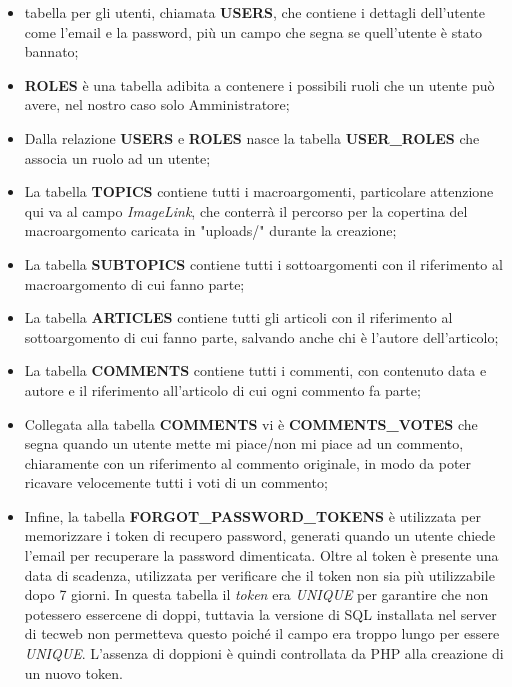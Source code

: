 \documentclass[12pt]{article}
\begin{document}
	\begin{itemize}
	\item tabella per gli utenti, chiamata \textbf{USERS}, che contiene i dettagli dell'utente come l'email e la password, più un campo che segna se quell'utente è stato bannato;
	\item \textbf{ROLES} è una tabella adibita a contenere i possibili ruoli che un utente può avere, nel nostro caso solo Amministratore;
	\item Dalla relazione \textbf{USERS} e \textbf{ROLES} nasce la tabella \textbf{USER\_ROLES} che associa un ruolo ad un utente;
	\item La tabella \textbf{TOPICS} contiene tutti i macroargomenti, particolare attenzione qui va al campo \textit{ImageLink}, che conterrà il percorso per la copertina del macroargomento caricata in "uploads/" durante la creazione;
	\item La tabella \textbf{SUBTOPICS} contiene tutti i sottoargomenti con il riferimento al macroargomento di cui fanno parte;
	\item La tabella \textbf{ARTICLES} contiene tutti gli articoli con il riferimento al sottoargomento di cui fanno parte, salvando anche chi è l'autore dell'articolo;
	\item La tabella \textbf{COMMENTS} contiene tutti i commenti, con contenuto data e autore e il riferimento all'articolo di cui ogni commento fa parte;
	\item Collegata alla tabella \textbf{COMMENTS} vi è \textbf{COMMENTS\_VOTES} che segna quando un utente mette mi piace/non mi piace ad un commento, chiaramente con un riferimento al commento originale, in modo da poter ricavare velocemente tutti i voti di un commento;
	\item Infine, la tabella \textbf{FORGOT\_PASSWORD\_TOKENS} è utilizzata per memorizzare i token di recupero password, generati quando un utente chiede l'email per recuperare la password dimenticata. Oltre al token è presente una data di scadenza, utilizzata per verificare che il token non sia più utilizzabile dopo 7 giorni. In questa tabella il \textit{token} era \textit{UNIQUE} per garantire che non potessero essercene di doppi, tuttavia la versione di SQL installata nel server di tecweb non permetteva questo poiché il campo era troppo lungo per essere \textit{UNIQUE}. L'assenza di doppioni è quindi controllata da PHP alla creazione di un nuovo token.
	\end{itemize}
	
\end{document}
